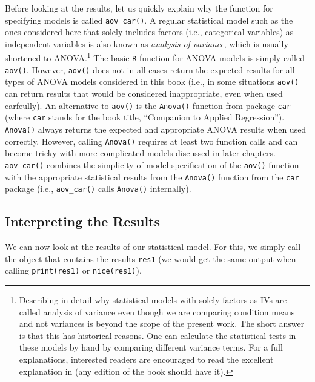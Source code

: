\documentclass[
]{book}
\begin{document}
Before looking at the results, let us quickly explain why the function for specifying models is called \texttt{aov\_car()}. A regular statistical model such as the ones considered here that solely includes factors (i.e., categorical variables) as independent variables is also known as \emph{analysis of variance}, which is usually shortened to ANOVA.\footnote{Describing in detail why statistical models with solely factors as IVs are called analysis of variance even though we are comparing condition means and not variances is beyond the scope of the present work. The short answer is that this has historical reasons. One can calculate the statistical tests in these models by hand by comparing different variance terms. For a full explanations, interested readers are encouraged to read the excellent explanation in \citet{howellStatisticalMethodsPsychology2013} (any edition of the book should have it).} The basic \texttt{R} function for ANOVA models is simply called \texttt{aov()}. However, \texttt{aov()} does not in all cases return the expected results for all types of ANOVA models considered in this book (i.e., in some situations \texttt{aov()} can return results that would be considered inappropriate, even when used carfeully). An alternative to \texttt{aov()} is the \texttt{Anova()} function from package \href{https://cran.r-project.org/package=car}{\texttt{car}} \citep{foxCompanionAppliedRegression2019} (where \texttt{car} stands for the book title, ``Companion to Applied Regression''). \texttt{Anova()} always returns the expected and appropriate ANOVA results when used correctly. However, calling \texttt{Anova()} requires at least two function calls and can become tricky with more complicated models discussed in later chapters. \texttt{aov\_car()} combines the simplicity of model specification of the \texttt{aov()} function with the appropriate statistical results from the \texttt{Anova()} function from the \texttt{car} package (i.e., \texttt{aov\_car()} calls \texttt{Anova()} internally).

\hypertarget{interpreting-the-results}{%
\subsection{Interpreting the Results}\label{interpreting-the-results}}

We can now look at the results of our statistical model. For this, we simply call the object that contains the results \texttt{res1} (we would get the same output when calling \texttt{print(res1)} or \texttt{nice(res1)}).
\end{document}
